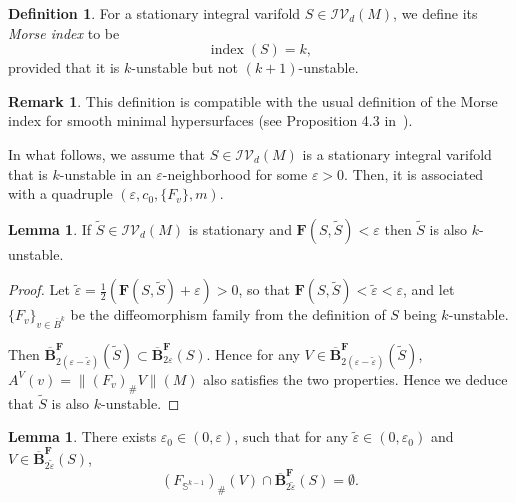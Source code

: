\documentclass[12pt,english]{article}
\theoremstyle{definition}
\newtheorem{lemma}[theorem]{Lemma}
\newtheorem{remark}[theorem]{Remark}
\newtheorem{definition}[theorem]{Definition}
\begin{document}
\begin{definition}
    For a stationary integral varifold $S \in \mathcal{IV}_d(M)$, we define its \textit{Morse index} to be
    \begin{equation*}
        \operatorname{index}(S) = k,
    \end{equation*}
    provided that it is $k$-unstable but not $(k + 1)$-unstable.
\end{definition}

\begin{remark}
    This definition is compatible with the usual definition of the Morse
index for smooth minimal hypersurfaces (see Proposition 4.3 in~\cite{MarquesNeves}).
\end{remark}

In what follows, we assume that $S \in \mathcal{IV}_d(M)$ is a stationary integral varifold that is $k$-unstable in an $\varepsilon$-neighborhood for some $\varepsilon > 0$. Then, it is associated with a quadruple $(\varepsilon, c_{0}, \{F_v\}, m)$.
\begin{lemma}
\label{lem:nearunstable}
  If $\tilde S\in \mathcal{IV}_d(M)$ is stationary and $\mathbf{F}(S,\tilde S)<\varepsilon$ then $\tilde S$ is also $k$-unstable.
\end{lemma}
\begin{proof}
      Let $\tilde\varepsilon=\frac{1}{2}(\mathbf{F}(S,\tilde S)+\varepsilon)>0$, so that $\mathbf{F}(S,\tilde S)<\tilde\varepsilon<\varepsilon$, and let $\{F_v\}_{v \in \overline{B}^k}$ be the diffeomorphism family from the definition of $S$ being $k$-unstable.

      Then $\overline{\textbf{B}}^{\mathbf{F}}_{2(\varepsilon-\tilde\varepsilon)}(\tilde S)\subset\overline{\textbf{B}}^{\mathbf{F}}_{2\varepsilon}(S)$.
      Hence for any $V\in\overline{\mathbf B}^{\mathbf F}_{2(\varepsilon-\tilde\varepsilon)}(\tilde S)$, $A^V(v) = \lVert (F_v)_\# V \rVert (M)$ also satisfies the two properties. Hence we deduce that $\tilde S$ is also $k$-unstable.
\end{proof}
\begin{lemma}
\label{lem:disjoint}
    There exists $\varepsilon_0 \in (0, \varepsilon)$, such that for any $\tilde{\varepsilon} \in (0, \varepsilon_0)$ and $V \in \mathbf{\overline{B}}^{\textbf{F}}_{2\tilde{\varepsilon}}(S)$,
    \begin{equation*}
        (F_{\mathbb S^{k-1}})_{\#} (V) \cap \mathbf{\overline{B}}^{\textbf{F}}_{2\tilde{\varepsilon}}(S) = \emptyset.
    \end{equation*}
\end{lemma}
\end{document}
